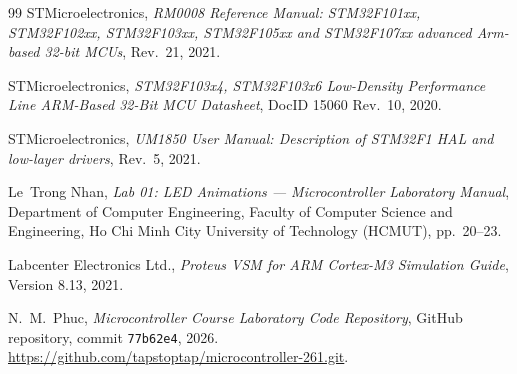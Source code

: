 \documentclass[oneside,final]{hcmut-report}
\begin{document}
\vspace{0.6em}
\begin{thebibliography}{99}
\small
\setlength{\itemsep}{1pt}
STMicroelectronics, \textit{RM0008 Reference Manual: STM32F101xx, STM32F102xx, STM32F103xx, STM32F105xx and STM32F107xx advanced Arm-based 32-bit MCUs}, Rev.~21, 2021.

STMicroelectronics, \textit{STM32F103x4, STM32F103x6 Low-Density Performance Line ARM-Based 32-Bit MCU Datasheet}, DocID 15060 Rev.~10, 2020.

STMicroelectronics, \textit{UM1850 User Manual: Description of STM32F1 HAL and low-layer drivers}, Rev.~5, 2021.

Le~Trong Nhan, \textit{Lab 01: LED Animations --- Microcontroller Laboratory Manual}, Department of Computer Engineering, Faculty of Computer Science and Engineering, Ho Chi Minh City University of Technology (HCMUT), pp.~20--23.

Labcenter Electronics Ltd., \textit{Proteus VSM for ARM Cortex-M3 Simulation Guide}, Version 8.13, 2021.

N.~M.~Phuc, \textit{Microcontroller Course Laboratory Code Repository}, GitHub repository, commit \texttt{77b62e4}, 2026. \url{https://github.com/tapstoptap/microcontroller-261.git}.
\end{thebibliography}
\end{document}
